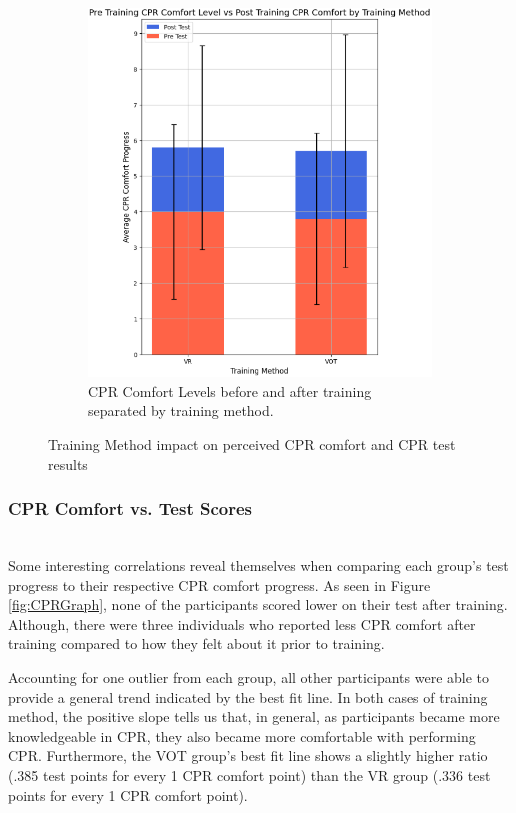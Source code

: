 \documentclass[manuscript]{./Models/acmart}
\begin{document}
\begin{figure}[h]
\begin{subfigure}[b]{0.51\textwidth}
        \includegraphics[width=\textwidth]{Photos/CPRComfortGraph.PNG}
        \caption{CPR Comfort Levels before and after training separated by training method.}
        \label{fig:CPRComfortGraph}
    \end{subfigure}
    \caption{Training Method impact on perceived CPR comfort and CPR test results}
\end{figure}

\subsubsection{CPR Comfort vs. Test Scores}
\hfill\\
Some interesting correlations reveal themselves when comparing each group's test progress to their respective CPR comfort progress. As seen in Figure \ref{fig:CPRGraph}, none of the participants scored lower on their test after training. Although, there were three individuals who reported less CPR comfort after training compared to how they felt about it prior to training.

Accounting for one outlier from each group, all other participants were able to provide a general trend indicated by the best fit line. In both cases of training method, the positive slope tells us that, in general, as participants became more knowledgeable in CPR, they also became more comfortable with performing CPR. Furthermore, the VOT group's best fit line shows a slightly higher ratio (.385 test points for every 1 CPR comfort point) than the VR group (.336 test points for every 1 CPR comfort point).
\end{document}
